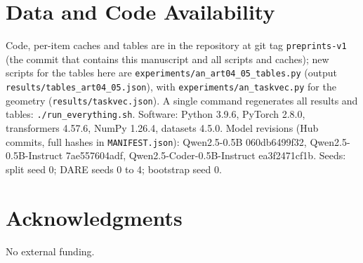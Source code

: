 \documentclass[conference]{IEEEtran}
\begin{document}
\section*{Data and Code Availability}
Code, per-item caches and tables are in the repository at git tag \texttt{preprints-v1} (the commit that contains this manuscript and all scripts and caches); new scripts for the tables here are \texttt{experiments/an\_art04\_05\_tables.py} (output \texttt{results/tables\_art04\_05.json}), with \texttt{experiments/an\_taskvec.py} for the geometry (\texttt{results/taskvec.json}). A single command regenerates all results and tables: \texttt{./run\_everything.sh}. Software: Python 3.9.6, PyTorch 2.8.0, transformers 4.57.6, NumPy 1.26.4, datasets 4.5.0. Model revisions (Hub commits, full hashes in \texttt{MANIFEST.json}): Qwen2.5-0.5B 060db6499f32, Qwen2.5-0.5B-Instruct 7ae557604adf, Qwen2.5-Coder-0.5B-Instruct ea3f2471cf1b. Seeds: split seed 0; DARE seeds 0 to 4; bootstrap seed 0.

\section*{Acknowledgments}
No external funding.
\end{document}
